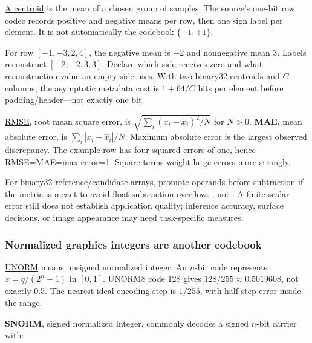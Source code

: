 \hyperref[appendix-4ccd7a775813]{A centroid} is the mean of a chosen group of samples. The source's one-bit row codec records positive and negative means per row, then one sign label per element. It is not automatically the codebook \(\{-1,+1\}\).

For row \([-1,-3,2,4]\), the negative mean is −2 and nonnegative mean 3. Labels  reconstruct \([-2,-2,3,3]\). Declare which side receives zero and what reconstruction value an empty side uses. With two binary32 centroids and \(C\) columns, the asymptotic metadata cost is \(1+64/C\) bits per element before padding/header---not exactly one bit.

\hyperref[appendix-537171d69d27]{RMSE}, root mean square error, is \(\sqrt{\sum_i(x_i-\widehat x_i)^2/N}\) for \(N>0\). \textbf{MAE}, mean absolute error, is \(\sum_i|x_i-\widehat x_i|/N\). Maximum absolute error is the largest observed discrepancy. The example row has four squared errors of one, hence RMSE=MAE=max error=1. Square terms weight large errors more strongly.

For binary32 reference/candidate arrays, promote operands before subtraction if the metric is meant to avoid float subtraction overflow: , not . A finite scalar error still does not establish application quality; inference accuracy, surface decisions, or image appearance may need task-specific measures.

\subsubsection{Normalized graphics integers are another codebook}\label{01-foundations-i-ch001-normalized-graphics-integers-are-another-codebook}

\hypertarget{01-foundations-i-ch001-normalized-graphics-integers-are-another-codebook}{}

\hyperref[appendix-b2402c453dac]{UNORM} means unsigned normalized integer. An \(n\)-bit code represents \(x=q/(2^n-1)\) in \([0,1]\). UNORM8 code 128 gives \(128/255\approx0.5019608\), not exactly 0.5. The nearest ideal encoding step is \(1/255\), with half-step error inside the range.

\textbf{SNORM}, signed normalized integer, commonly decodes a signed \(n\)-bit carrier with:

